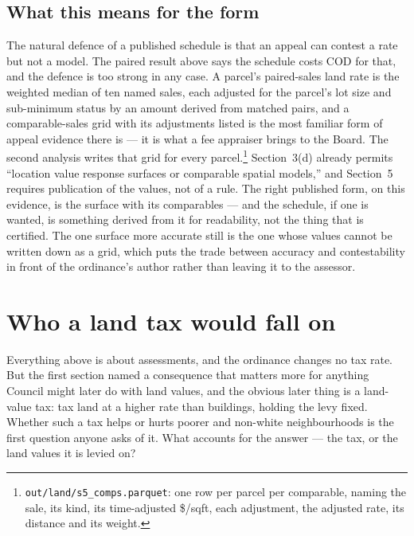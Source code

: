 \documentclass[11pt]{article}
\begin{document}
\subsection{What this means for the form}

The natural defence of a published schedule is that an appeal can contest a rate but not a
model. The paired result above says the schedule costs \LycdSfiveVsSthreeDiffAbs{} COD for that,
and the defence is too strong in any case. A parcel's paired-sales land rate is
the weighted median of ten named sales, each adjusted for the parcel's lot size and sub-minimum
status by an amount derived from matched pairs, and a comparable-sales grid with its adjustments
listed is the most familiar form of appeal evidence there is --- it is what a fee appraiser
brings to the Board. The second analysis writes that grid for every parcel.\footnote{
\texttt{out/land/s5\_comps.parquet}: one row per parcel per comparable, naming the sale, its
kind, its time-adjusted \$/sqft, each adjustment, the adjusted rate, its distance and its
weight.} Section~3(d) already permits ``location value response surfaces or comparable spatial
models,'' and Section~5 requires publication of the values, not of a rule. The right published
form, on this evidence, is the surface with its comparables --- and the schedule, if one is
wanted, is something derived from it for readability, not the thing that is certified. The one
surface more accurate still is the one whose values cannot be written down as a grid, which puts
the trade between accuracy and contestability in front of the ordinance's author rather than
leaving it to the assessor.

\section{Who a land tax would fall on}\label{sec:equity}

Everything above is about assessments, and the ordinance changes no tax rate. But the first
section named a consequence that matters more for anything Council might later do with land
values, and the obvious later thing is a land-value tax: tax land at a higher rate than
buildings, holding the levy fixed. Whether such a tax helps or hurts poorer and non-white
neighbourhoods is the first question anyone asks of it. What accounts for the answer --- the tax,
or the land values it is levied on?
\end{document}
